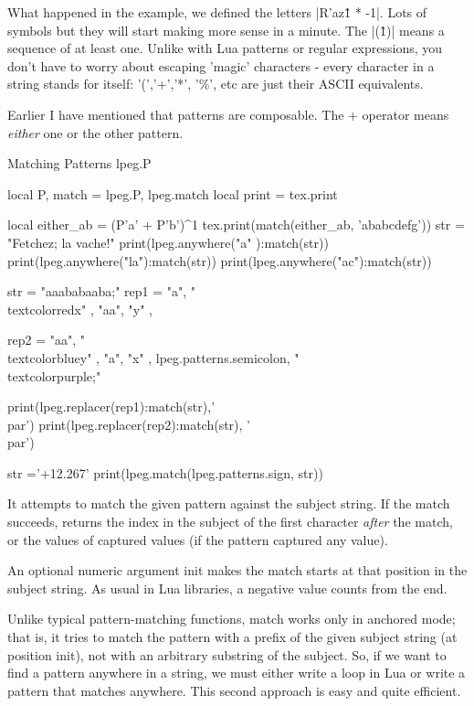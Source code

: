 What happened in the example, we defined the letters |R'az\^1 * -1|. Lots of symbols but they will start making more sense in a minute. The  |(\^1)| means a sequence of at least one. Unlike with Lua patterns or regular expressions, you don't have to worry about escaping 'magic' characters - every character in a string stands for itself: '(','+','*', '\%', etc are just their ASCII equivalents. 

Earlier I have mentioned that patterns are composable. The + operator means \emph{either} one or the other pattern.

\begin{texexample}{Matching Patterns lpeg.P}{}
\begin{luacode}
local P, match = lpeg.P, lpeg.match
local print = tex.print
       
local either_ab = (P'a' + P'b')^1
        tex.print(match(either_ab,  'ababcdefg'))
     str = "Fetchez; la vache!"
print(lpeg.anywhere("a" ):match(str))
print(lpeg.anywhere("la"):match(str))
print(lpeg.anywhere("ac"):match(str))  



 str = "aaababaaba;"
rep1 = {
    { "a",  "\\textcolor{red}{x}" },
    { "aa", "y" },
}

rep2 = {
    { "aa", "\\textcolor{blue}{y}" },
    { "a",  "x" },
    {lpeg.patterns.semicolon, "\\textcolor{purple}{;}"}
}

print(lpeg.replacer(rep1):match(str),'\\par')
print(lpeg.replacer(rep2):match(str), '\\par') 

str ='+12.267'
print(lpeg.match(lpeg.patterns.sign, str))
\end{luacode}
\end{texexample}

It attempts to match the given pattern against the subject string. If the match succeeds, returns the index in the subject of the first character \emph{after} the match, or the values of captured values (if the pattern captured any value).

An optional numeric argument init makes the match starts at that position in the subject string. As usual in Lua libraries, a negative value counts from the end.

Unlike typical pattern-matching functions, match works only in anchored mode; that is, it tries to match the pattern with a prefix of the given subject string (at position init), not with an arbitrary substring of the subject. So, if we want to find a pattern anywhere in a string, we must either write a loop in Lua or write a pattern that matches anywhere. This second approach is easy and quite efficient.

